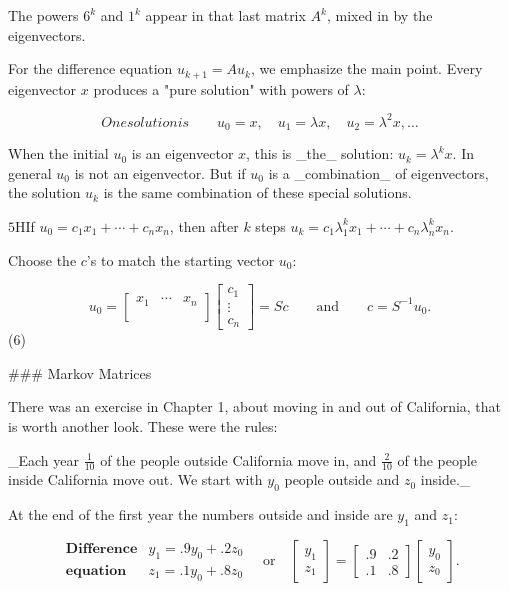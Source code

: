 The powers \(6^{k}\) and \(1^{k}\) appear in that last matrix \(A^{k}\), mixed in by the eigenvectors.

For the difference equation \(u_{k+1}=Au_{k}\), we emphasize the main point. Every eigenvector \(x\) produces a "pure solution" with powers of \(\lambda\):

\[\boxed{One solution is}\qquad u_{0}=x,\quad u_{1}=\lambda x,\quad u_{2}=\lambda^{2}x,\ldots\]

When the initial \(u_{0}\) is an eigenvector \(x\), this is _the_ solution: \(u_{k}=\lambda^{k}x\). In general \(u_{0}\) is not an eigenvector. But if \(u_{0}\) is a _combination_ of eigenvectors, the solution \(u_{k}\) is the same combination of these special solutions.

\(5\)HIf \(u_{0}=c_{1}x_{1}+\cdots+c_{n}x_{n}\), then after \(k\) steps \(u_{k}=c_{1}\lambda_{1}^{k}x_{1}+\cdots+c_{n}\lambda_{n}^{k}x_{n}\).

Choose the \(c\)'s to match the starting vector \(u_{0}\):

\[u_{0}=\begin{bmatrix}x_{1}&\cdots&x_{n}\\ &&\\ \end{bmatrix}\begin{bmatrix}c_{1}\\ \vdots\\ c_{n}\end{bmatrix}=Sc\qquad\text{and}\qquad c=S^{-1}u_{0}.\] (6)

### Markov Matrices

There was an exercise in Chapter 1, about moving in and out of California, that is worth another look. These were the rules:

_Each year \(\frac{1}{10}\) of the people outside California move in, and \(\frac{2}{10}\) of the people inside California move out. We start with \(y_{0}\) people outside and \(z_{0}\) inside._

At the end of the first year the numbers outside and inside are \(y_{1}\) and \(z_{1}\):

\[\begin{array}{ll}\textbf{Difference}&y_{1}=.9y_{0}+.2z_{0}\\ \textbf{equation}&z_{1}=.1y_{0}+.8z_{0}\end{array}\quad\text{or}\quad\begin{bmatrix} y_{1}\\ z_{1}\end{bmatrix}=\begin{bmatrix}.9&.2\\ .1&.8\end{bmatrix}\begin{bmatrix}y_{0}\\ z_{0}\end{bmatrix}.\]


